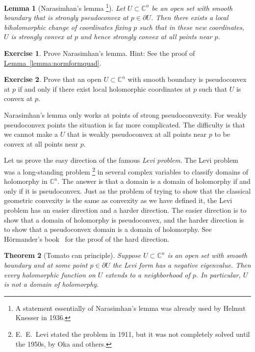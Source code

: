 \documentclass[12pt,openany]{book}
\newcommand{\C}{{\mathbb{C}}}
\newcommand{\myindex}[1]{#1\index{#1}}
\theoremstyle{plain}
\newtheorem{thm}{Theorem}[section]
\newtheorem{lemma}[thm]{Lemma}
\theoremstyle{remark}
\theoremstyle{definition}
\newenvironment{exbox}{%
    \def\FrameCommand{\vrule width 1pt \relax\hspace{10pt}}%
    \MakeFramed{\advance\hsize-\width\FrameRestore}%
}{%
    \endMakeFramed
}
\theoremstyle{exercise}
\newtheorem{exercise}{Exercise}[section]
\theoremstyle{example}
\newcommand{\lemmaref}[1]{\hyperref[#1]{Lemma~\ref*{#1}}}
\begin{document}
\begin{lemma}[Narasimhan's lemma%
\footnote{A statement essentially of Narasimhan's lemma was already used by Helmut
Knesser in 1936.}]
Let $U \subset \C^n$ be an open set with smooth boundary
that is strongly pseudoconvex at $p \in \partial U$.  Then there exists a local biholomorphic change of
coordinates fixing $p$ such that in these new coordinates, $U$ is strongly
convex at $p$ and hence strongly convex at all points near $p$.
\end{lemma}

\begin{exbox}
\begin{exercise}
Prove Narasimhan's lemma.  Hint: See the proof of \lemmaref{lemma:normformquad}.
\end{exercise}

\begin{exercise}
Prove that an open $U \subset \C^n$ with smooth boundary is pseudoconvex at
$p$ if and only if there exist local holomorphic coordinates at $p$ such that 
$U$ is convex at $p$.
\end{exercise}
\end{exbox}

Narasimhan's lemma only works at points of strong
pseudoconvexity.  For weakly pseudoconvex points the situation is far more
complicated.  The difficulty is that we cannot make a $U$ that is
weakly pseudoconvex at all points near $p$ to be convex at all points near $p$.

\medskip


Let us prove the easy direction of the famous 
\emph{\myindex{Levi problem}}.  The Levi problem was a long-standing
problem%
\footnote{E.\ E.\ Levi stated the problem in 1911, but it was not completely
solved until the 1950s, by Oka and others.}
in several complex variables to classify domains of holomorphy in
$\C^n$.  The answer is that a domain is a domain of holomorphy if and only
if it is pseudoconvex.  Just as the problem of trying to show that
the classical geometric convexity is the same as convexity as we have
defined it, 
the Levi problem has an easier direction and a harder direction.
The easier direction is to show that a domain of holomorphy is pseudoconvex, and
the harder direction is to show that a pseudoconvex domain is a domain of
holomorphy.  See H\"ormander's book~\cite{Hormander} for the proof
of the hard direction.

\begin{thm}[Tomato can principle] \label{thm:tomatocan}
Suppose
$U \subset \C^n$ is an open set with smooth boundary and at some point $p \in
\partial U$ the Levi form has a negative eigenvalue.
Then every holomorphic function on $U$
extends to a neighborhood of $p$.
In particular, $U$ is not
a domain of holomorphy.
\end{thm}
\end{document}

